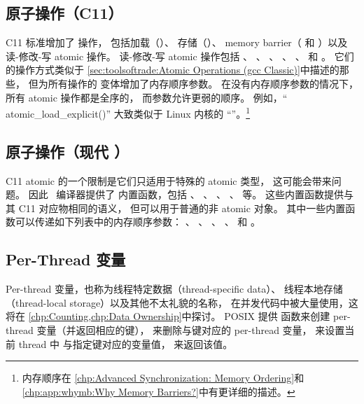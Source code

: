 \subsection{原子操作（C11）}
\label{sec:toolsoftrade:Atomic Operations (C11)}

C11 标准增加了  操作，
包括加载（）、
存储（）、
memory barrier（ 和
）以及读-修改-写 atomic 操作。
读-修改-写 atomic 操作包括
、
、
、
、
、
和
。
它们的操作方式类似于
\cref{sec:toolsoftrade:Atomic Operations (gcc Classic)}中描述的那些，
但为所有操作的  变体增加了内存顺序参数。
在没有内存顺序参数的情况下，所有 atomic 操作都是全序的，
而参数允许更弱的顺序。
例如，``
{atomic_load_explicit()}''
大致类似于 Linux 内核的 ``''。\footnote{
	内存顺序在
	\cref{chp:Advanced Synchronization: Memory Ordering}和
	\cref{chp:app:whymb:Why Memory Barriers?}中有更详细的描述。}

\subsection{原子操作（现代 \GCC）}
\label{sec:toolsoftrade:Atomic Operations (Modern gcc)}

C11 atomic 的一个限制是它们只适用于特殊的 atomic 类型，
这可能会带来问题。
因此 \GNUC\ 编译器提供了  内置函数，包括
、
、
、
、
 等。
这些内置函数提供与其 C11 对应物相同的语义，
但可以用于普通的非 atomic 对象。
其中一些内置函数可以传递如下列表中的内存顺序参数：
、
、
、
、
 和
。

\subsection{Per-Thread 变量}
\label{sec:toolsoftrade:Per-Thread Variables}

Per-thread 变量，也称为线程特定数据（thread-specific data）、
线程本地存储（thread-local storage）以及其他不太礼貌的名称，
在并发代码中被大量使用，这将在
\cref{chp:Counting,chp:Data Ownership}中探讨。
POSIX 提供  函数来创建
per-thread 变量（并返回相应的键），
 来删除与键对应的 per-thread 变量，
 来设置当前 thread 中
与指定键对应的变量值，
 来返回该值。

